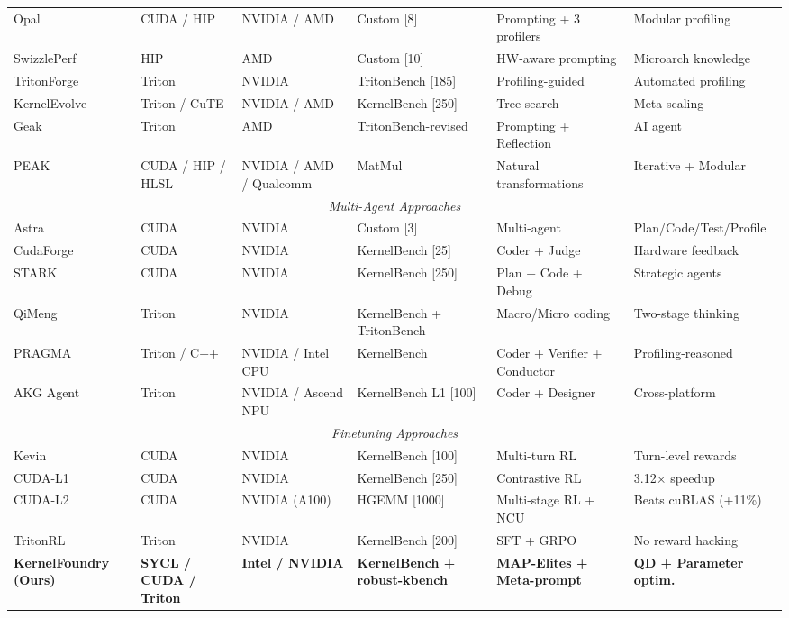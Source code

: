 \begin{table}[ht]
{\begin{tabular}{llllll}
			Opal~\citep{zaeed2025opal} & CUDA / HIP & NVIDIA / AMD & Custom [8] & Prompting + 3 profilers & Modular profiling \\
			SwizzlePerf~\citep{tschand2025swizzleperf} & HIP & AMD & Custom [10] & HW-aware prompting & Microarch knowledge \\
			TritonForge~\citep{li2025tritonforge} & Triton & NVIDIA & TritonBench [185] & Profiling-guided & Automated profiling \\
			KernelEvolve~\citep{liao2025kernelevolve} & Triton / CuTE & NVIDIA / AMD & KernelBench [250] & Tree search & Meta scaling \\
			Geak~\citep{wang2025geak} & Triton & AMD & TritonBench-revised & Prompting + Reflection & AI agent \\
			PEAK~\citep{tariq2025peak} & CUDA / HIP / HLSL & NVIDIA / AMD / Qualcomm & MatMul & Natural transformations & Iterative + Modular \\
			\midrule
			\multicolumn{6}{c}{\textit{Multi-Agent Approaches}} \\
			\midrule
			Astra~\citep{wei2025astra} & CUDA & NVIDIA & Custom [3] & Multi-agent & Plan/Code/Test/Profile \\
			CudaForge~\citep{zhang2025cudaforge} & CUDA & NVIDIA & KernelBench [25] & Coder + Judge & Hardware feedback \\
			STARK~\citep{dong2025stark} & CUDA & NVIDIA & KernelBench [250] & Plan + Code + Debug & Strategic agents \\
			QiMeng~\citep{zhu2025qimeng} & Triton & NVIDIA & KernelBench + TritonBench & Macro/Micro coding & Two-stage thinking \\
			PRAGMA~\citep{lei2025pragma} & Triton / C++ & NVIDIA / Intel CPU & KernelBench & Coder + Verifier + Conductor & Profiling-reasoned \\
			AKG Agent~\citep{du2025akg} & Triton & NVIDIA / Ascend NPU & KernelBench L1 [100] & Coder + Designer & Cross-platform \\
			\midrule
			\multicolumn{6}{c}{\textit{Finetuning Approaches}} \\
			\midrule
			Kevin~\citep{baronio2025kevin} & CUDA & NVIDIA & KernelBench [100] & Multi-turn RL & Turn-level rewards \\
			CUDA-L1~\citep{li2025cuda} & CUDA & NVIDIA & KernelBench [250] & Contrastive RL & 3.12$\times$ speedup \\
			CUDA-L2~\citep{su2025cuda} & CUDA & NVIDIA (A100) & HGEMM [1000] & Multi-stage RL + NCU & Beats cuBLAS (+11\%) \\
			TritonRL~\citep{woo2025tritonrl} & Triton & NVIDIA & KernelBench [200] & SFT + GRPO & No reward hacking \\
			\midrule
			\textbf{KernelFoundry (Ours)} & \textbf{SYCL / CUDA / Triton} & \textbf{Intel / NVIDIA} & \textbf{KernelBench + robust-kbench} & \textbf{MAP-Elites + Meta-prompt} & \textbf{QD + Parameter optim.} \\
			\bottomrule
		\end{tabular}%
	}
\end{table}

